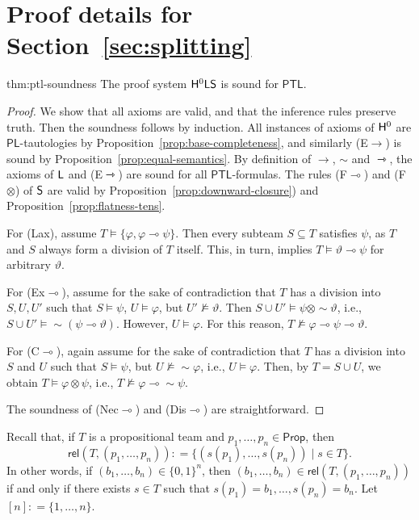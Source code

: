 \documentclass[a4paper,english,fleqn,11pt,final]{scrartcl}
\makeatletter
\newcommand{\ie}{i.e.\@\xspace}
\newcommand{\negg}{{\sim}}
\newcommand{\logic}[1]{\ensuremath{\mathsf{#1}}\xspace}
\newcommand{\PS}{\logic{Prop}}
\newcommand{\PL}{\logic{PL}}
\newcommand{\PTL}{\logic{PTL}}
\newcommand{\sfS}{\protect\ensuremath{\mathsf{S}}}
\newcommand{\sfH}{\protect\ensuremath{\mathsf{H}}}
\newcommand{\sfL}{\protect\ensuremath{\mathsf{L}}}
\providecommand{\dfn}{\mathrel{\mathop:}=}
\newcommand{\imp}{\rightarrow}
\newcommand{\limp}{\multimap}
\newcommand{\timp}{\rightarrowtriangle}
\newcommand{\tens}{\otimes}
\newcommand{\Deriv}[1]{{\normalfont\textsf{#1}}}
\newcommand{\rel}{\mathsf{rel}}
\theoremstyle{plain}
\theoremstyle{definition}
\makeatother
\begin{document}
\section{Proof details for Section~\ref{sec:splitting}}

\begin{reptheorem}{thm:ptl-soundness}
The proof system $\sfH^0\sfL\sfS$ is sound for $\PTL$.
\end{reptheorem}
\begin{proof}\label{p:soundproof}
We show that all axioms are valid, and that the inference rules preserve truth.
Then the soundness follows by induction.
All instances of axioms of $\sfH^0$ are $\PL$-tautologies by Proposition~\ref{prop:base-completeness}, and similarly \Deriv{(E$\imp$)} is sound by Proposition~\ref{prop:equal-semantics}.
By definition of $\imp$, $\negg$ and $\timp$, the axioms of $\sfL$ and \Deriv{(E$\timp$)} are sound for all $\PTL$-formulas.
The rules \Deriv{(F$\limp$)} and \Deriv{(F$\tens$)} of $\sfS$ are valid by Proposition~\ref{prop:downward-closure}) and Proposition~\ref{prop:flatness-tens}.

For \Deriv{(Lax)}, assume $T \vDash \{\varphi,\varphi\limp\psi\}$.
Then every subteam $S \subseteq T$ satisfies $\psi$, as $T$ and $S$ always form a division of $T$ itself.
This, in turn, implies $T \vDash\vartheta \limp \psi$ for arbitrary $\vartheta$.

For \Deriv{(Ex$\limp$)}, assume for the sake of contradiction that $T$ has a division into $S,U,U'$ such that $S \vDash \psi$, $U\vDash \varphi$, but $U'\nvDash\vartheta$.
Then $S \cup U' \vDash \psi \tens \negg\vartheta$, \ie, $S \cup U' \vDash \negg(\psi \limp \vartheta)$.
However, $U \vDash \varphi$.
For this reason, $T \nvDash \varphi \limp \psi \limp \vartheta$.

For \Deriv{(C$\limp$)}, again assume for the sake of contradiction that $T$ has a division into $S$ and $U$ such that $S \vDash \psi$, but $U \nvDash \negg\varphi$, \ie, $U \vDash \varphi$.
Then, by $T= S \cup U$, we obtain $T \vDash \varphi \tens \psi$, \ie, $T \nvDash \varphi\limp\negg\psi$.

The soundness of \Deriv{(Nec$\limp$)} and \Deriv{(Dis$\limp$)} are straightforward.
\end{proof}



Recall that, if $T$ is a propositional team and $p_1,\ldots,p_n \in \PS$, then
\[
\rel(T, (p_1,\ldots,p_n)) \dfn \{ (s(p_1),\ldots,s(p_n)) \mid s \in T \} \text{.}
\]
In other words, if $(b_1,\ldots,b_n) \in \{0,1\}^n$, then $(b_1,\ldots,b_n) \in \rel(T, (p_1,\ldots,p_n))$ if and only if there exists $s \in T$ such that $s(p_1) = b_1,\ldots,s(p_n) = b_n$.
Let $[n] \dfn \{1,\ldots,n\}$.
\end{document}
